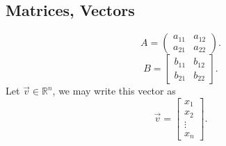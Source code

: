 \documentclass{article}
\begin{document}
        \subsection{Matrices, Vectors}
            \begin{equation}
                A = 
                \begin{pmatrix}
                    a_{11} & a_{12} \\
                    a_{21} & a_{22}
                \end{pmatrix}.
            \end{equation}
            \begin{equation}
                B = 
                \begin{bmatrix}
                b_{11} & b_{12} \\
                b_{21} & b_{22}
                \end{bmatrix}.
            \end{equation}
            Let $\vec{v} \in \mathbb{R}^{n}$, we may write this vector as
            \begin{equation}
                \vec{v} = 
                \begin{bmatrix}
                    x_{1} \\
                    x_{2} \\
                    \vdots \\
                    x_{n}
                \end{bmatrix}.
            \end{equation}

\end{document}
